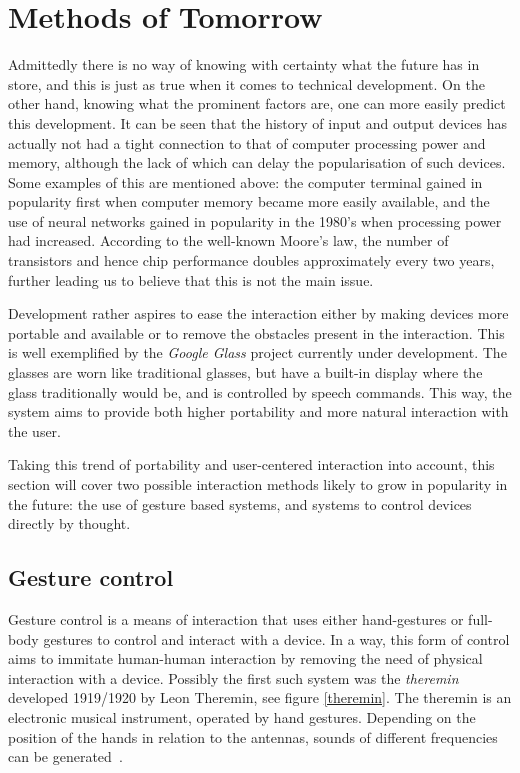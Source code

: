 
\section{Methods of Tomorrow}
\label{future}
Admittedly there is no way of knowing with certainty what the future has in store, and this is just as true when it comes to technical development. On the other hand, knowing what the prominent factors are, one can more easily predict this development. It can be seen that the history of input and output devices has actually not had a tight connection to that of computer processing power and memory, although the lack of which can delay the popularisation of such devices. Some examples of this are mentioned above: the computer terminal gained in popularity first when computer memory became more easily available, and the use of neural networks gained in popularity in the 1980's when processing power had increased. According to the well-known Moore's law, the number of transistors and hence chip performance doubles approximately every two years, further leading us to believe that this is not the main issue.

Development rather aspires to ease the interaction either by making devices more portable and available or to remove the obstacles present in the interaction. This is well exemplified by the \emph{Google Glass} project currently under development. The glasses are worn like traditional glasses, but have a built-in display where the glass traditionally would be, and is controlled by speech commands. This way, the system aims to provide both higher portability and more natural interaction with the user.

Taking this trend of portability and user-centered interaction into account, this section will cover two possible interaction methods likely to grow in popularity in the future: the use of gesture based systems, and systems to control devices directly by thought. 


\subsection{Gesture control}
Gesture control is a means of interaction that uses either hand-gestures or full-body gestures to control and interact with a device. In a way, this form of control aims to immitate human-human interaction by removing the need of physical interaction with a device. Possibly the first such system was the \emph{theremin} developed 1919/1920 by Leon Theremin, see figure \ref{theremin}. The theremin is an electronic musical instrument, operated by hand gestures. Depending on the position of the hands in relation to the antennas, sounds of different frequencies can be generated~\cite{thereminpatent}.

